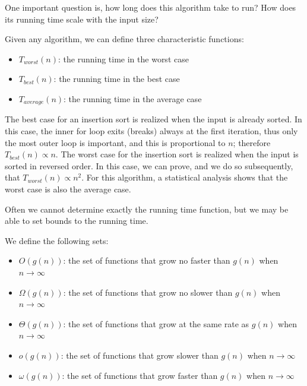 \documentclass[justified, sixbynine]{tufte-book}
\theoremstyle{plain}%
\newtheorem * {corollary}{Corollary}
\theoremstyle{definition}
\theoremstyle{remark}
\newtheorem * {remark}{Remark}
\newtheorem * {note}{Note}
\begin{document}
\begin{fullwidth}
One important question is, how long does this algorithm take to run? How does its running time scale with the input size?

Given any algorithm, we can define three characteristic functions:

\begin{itemize}
\item  $T_{worst}(n)$: the running time in the worst case

\item  $T_{best}(n)$: the running time in the best case

\item  $T_{average}(n)$: the running time in the average case
\end{itemize}

The best case for an insertion sort is realized when the input is already sorted. In this case, the inner for loop exits (breaks) always at the first iteration, thus only the most outer loop is important, and this is proportional to $n$; therefore $T_{best}(n) \propto n$. The worst case for the insertion sort is realized when the input is sorted in reversed order. In this case, we can prove, and we do so subsequently, that $T_{worst}(n) \propto n^2$. For this algorithm, a statistical analysis shows that the worst case is also the average case.

Often we cannot determine exactly the running time function, but we may be able to set bounds to the running time.

We define the following sets:

\begin{itemize}
\item  $O(g(n))$: the set of functions that grow no faster than $g(n)$ when $%
n\rightarrow \infty $

\item  $\Omega (g(n))$: the set of functions that grow no slower than $g(n)$ when $%
n\rightarrow \infty $

\item  $\Theta (g(n))$: the set of functions that grow at the same rate as $g(n)$ when $%
n\rightarrow \infty $

\item  $o(g(n))$: the set of functions that grow slower than $g(n)$ when $n\rightarrow
\infty $

\item  $\omega (g(n))$: the set of functions that grow faster than $g(n)$ when $n\rightarrow \infty $
\end{itemize}


\end{fullwidth}
\end{document}
